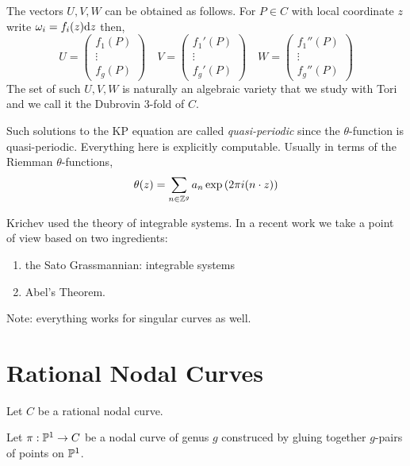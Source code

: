 \documentclass[12pt]{article}
\begin{document}
\begin{rmk}
The vectors $U,V,W$ can be obtained as follows. For $P \in C$ with local coordinate $z$ write $\omega_i = f_i(z) \d{z}$ then,
\[ U = \begin{pmatrix}
f_1(P)
\\
\vdots
\\
f_g(P)
\end{pmatrix}
\quad
V = \begin{pmatrix}
f_1'(P)
\\
\vdots
\\
f_g'(P)
\end{pmatrix}
\quad 
W = 
\begin{pmatrix}
f_1''(P)
\\
\vdots
\\
f_g''(P)
\end{pmatrix} \]
The set of such $U,V,W$ is naturally an algebraic variety that we study with Tori and we call it the Dubrovin 3-fold of $C$.  
\end{rmk}

\begin{rmk}
Such solutions to the KP equation are called \textit{quasi-periodic} since the $\theta$-function is quasi-periodic. Everything here is explicitly computable. Usually in terms of the Riemman $\theta$-functions,
\[ \theta(z) = \sum_{n \in \Z^g} a_n \exp{(2 \pi i (n \cdot z))} \]
\end{rmk}

\begin{rmk}
Krichev used the theory of integrable systems. In a recent work we take a point of view based on two ingredients:
\begin{enumerate}
\item the Sato Grassmannian: integrable systems
\item Abel's Theorem.
\end{enumerate}
Note: everything works for singular curves as well. 
\end{rmk}

\section{Rational Nodal Curves}

Let $C$ be a rational nodal curve. 

\begin{example}
Let $\pi : \P^1 \to C$ be a nodal curve of genus $g$ construced by gluing together $g$-pairs of points on $\P^1$. 
\end{example}
\end{document}
